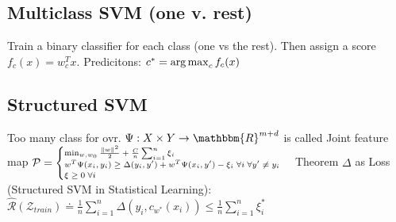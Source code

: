 \subsection*{Multiclass SVM (one v. rest)}
Train a binary classifier for each class (one vs the rest). Then assign a score $f_c(x)=w_c^Tx$. Predicitons: $c^*=\operatorname*{arg\,max}_c f_c(x)$
\subsection*{Structured SVM}
Too many class for ovr. $\Psi: X \times Y \rightarrow \mathbbm{R}^{m+d}$ is called Joint feature map
\( 
	\mathcal{P}= \scriptsize
\begin{cases}
	\min_{w,w_0} \frac{\left\lVert w\right\rVert^2}{2} + \frac{C}{n}\sum_{i=1}^n \xi_i\\
	w^T\Psi(x_i,y_i)\geq \Delta(y_i,y') + w^T\Psi(x_i,y') -\xi_i\;\forall i\; \forall y' \neq y_i\\
	\xi \geq 0 \;\forall i\\
\end{cases}
\)
Theorem \(\Delta\) as Loss (Structured SVM in Statistical Learning):\\
$\hat{\mathcal{R}}(\mathcal{Z}_{train})\doteq \frac{1}{n} \sum_{i=1}^n \Delta(y_i, c_{w^*}(x_i)) \leq \frac{1}{n}\sum_{i=1}^n \xi^*_i$







